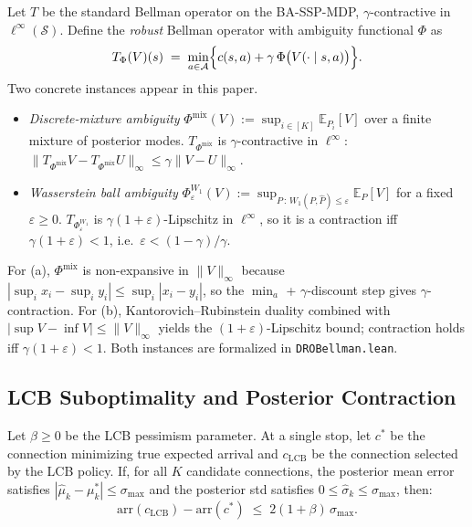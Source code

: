 \documentclass[opre,dblanonrev]{informs4}
\renewenvironment{proof}{\Trivlist\item[\hspace*{1em}\hskip\labelsep{\itshape Proof.\enskip}]\ignorespaces}{\endTrivlist\addvspace{0pt}}
\begin{document}
\begin{theorem}\label{thm:bellman}
Let $T$ be the standard Bellman operator on the BA-SSP-MDP,
$\gamma$-contractive in $\ell^\infty(\mathcal S)$. Define the
\emph{robust} Bellman operator with ambiguity functional $\Phi$ as
\[
T_\Phi(V)(s) \;=\; \min_{a\in\mathcal{A}}\Bigl\{
  c(s,a) + \gamma\,\Phi\bigl(V(\cdot \mid s,a)\bigr)\Bigr\}.
\]
Two concrete instances appear in this paper.
\begin{itemize}[leftmargin=1.2em,itemsep=0.15em]
\item[\textbf{(a)}] \emph{Discrete-mixture ambiguity}
$\Phi^{\mathrm{mix}}(V) := \sup_{i\in[K]} \mathbb{E}_{P_i}[V]$ over a finite
mixture of posterior modes. $T_{\Phi^{\mathrm{mix}}}$ is
$\gamma$-contractive in $\ell^\infty$:
$\|T_{\Phi^{\mathrm{mix}}}V - T_{\Phi^{\mathrm{mix}}}U\|_\infty \leq \gamma\|V-U\|_\infty$.
\item[\textbf{(b)}] \emph{Wasserstein ball ambiguity}
$\Phi^{W_1}_\varepsilon(V) := \sup_{P\,:\,W_1(P,\hat P)\leq\varepsilon}
\mathbb{E}_P[V]$ for a fixed $\varepsilon\!\geq\!0$.
$T_{\Phi^{W_1}_\varepsilon}$ is $\gamma(1+\varepsilon)$-Lipschitz in
$\ell^\infty$, so it is a contraction iff $\gamma(1+\varepsilon)<1$,
i.e.\ $\varepsilon < (1-\gamma)/\gamma$.
\end{itemize}
\end{theorem}

\begin{proof}[Proof sketch (full proof in EC.\ref{ec:detailed_proofs}).]
For (a), $\Phi^{\mathrm{mix}}$ is non-expansive in $\|V\|_\infty$
because $|\sup_i x_i-\sup_i y_i|\leq\sup_i|x_i-y_i|$, so the
$\min_a$ + $\gamma$-discount step gives
$\gamma$-contraction. For (b), Kantorovich--Rubinstein duality
combined with $|\sup V - \inf V|\leq\|V\|_\infty$ yields the
$(1+\varepsilon)$-Lipschitz bound; contraction holds iff
$\gamma(1+\varepsilon)<1$. Both instances are formalized in
\texttt{DROBellman.lean}.
\end{proof}

\subsection{LCB Suboptimality and Posterior Contraction}

\begin{lemma}\label{lem:perstep}
Let $\beta \geq 0$ be the LCB pessimism parameter. At a single stop,
let $c^*$ be the connection minimizing true expected arrival and
$c_{\mathrm{LCB}}$ be the connection selected by the LCB policy.
If, for all $K$ candidate connections, the posterior mean error
satisfies $|\hat\mu_k - \mu^*_k| \leq \sigma_{\max}$ and the
posterior std satisfies $0 \leq \hat\sigma_k \leq \sigma_{\max}$,
then:
\[
\mathrm{arr}(c_{\mathrm{LCB}}) - \mathrm{arr}(c^*) \;\leq\; 2(1+\beta)\,\sigma_{\max}.
\]
\end{lemma}
\end{document}
